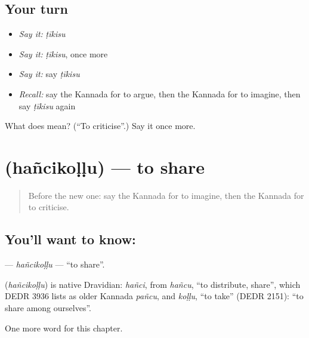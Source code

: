 \subsection*{Your turn}
\begin{itemize}
\raggedright
  \item \emph{Say it:} \emph{ṭīkisu}
  \item \emph{Say it:} \emph{ṭīkisu}, once more
  \item \emph{Say it:} say \emph{ṭīkisu}
  \item \emph{Recall:} say the Kannada for to argue, then the Kannada for to imagine, then say \emph{ṭīkisu} again
\end{itemize}

\begin{tcolorbox}[breakable,colback=teal!4,colframe=teal!35!black,title={Before you move on}]
What does  mean? (\textquotedblleft{}To criticise\textquotedblright{}.) Say it once more.
\end{tcolorbox}
\section[\texorpdfstring{\kn{ಹಂಚಿಕೊಳ್ಳು} (hañcikoḷḷu)}{ಹಂಚಿಕೊಳ್ಳು (hañcikoḷḷu)}]{ (hañcikoḷḷu) — to share}

\label{lesson:KA-C241-hancikollu}



\begin{quote}
Before the new one: say the Kannada for to imagine, then the Kannada for to criticise.
\end{quote}

\subsection*{You'll want to know: }
\textbf{} — \emph{hañcikoḷḷu} — \textquotedblleft{}to share\textquotedblright{}.

\begin{cousinweb}
\textbf{} (\emph{hañcikoḷḷu}) is native Dravidian: \emph{hañci}, from \emph{hañcu}, \textquotedblleft{}to distribute, share\textquotedblright{}, which DEDR 3936 lists as older Kannada \emph{pañcu}, and \emph{koḷḷu}, \textquotedblleft{}to take\textquotedblright{} (DEDR 2151): \textquotedblleft{}to share among ourselves\textquotedblright{}.
\end{cousinweb}

\begin{grammarlens}[title={What you've built}]
One more word for this chapter.
\end{grammarlens}

